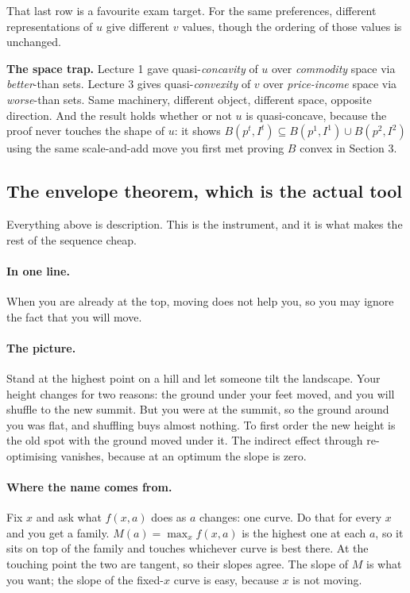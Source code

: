 \documentclass[11pt]{article}
\theoremstyle{definition}
\newenvironment{keybox}{\begin{snugshade}\noindent\ignorespaces}{\end{snugshade}}
\begin{document}
\vspace{3pt}
That last row is a favourite exam target. For the same preferences, different
representations of $u$ give different $v$ values, though the ordering of those values is
unchanged.

\begin{keybox}
\textbf{The space trap.} Lecture 1 gave quasi-\emph{concavity} of $u$ over \emph{commodity}
space via \emph{better}-than sets. Lecture 3 gives quasi-\emph{convexity} of $v$ over
\emph{price-income} space via \emph{worse}-than sets. Same machinery, different object,
different space, opposite direction. And the result holds whether or not $u$ is
quasi-concave, because the proof never touches the shape of $u$: it shows
$B(p^t,I^t)\subseteq B(p^1,I^1)\cup B(p^2,I^2)$ using the same scale-and-add move you first
met proving $B$ convex in Section 3.
\end{keybox}

\subsection{The envelope theorem, which is the actual tool}

Everything above is description. This is the instrument, and it is what makes the rest of
the sequence cheap.

\paragraph{In one line.} When you are already at the top, moving does not help you, so you
may ignore the fact that you will move.

\paragraph{The picture.} Stand at the highest point on a hill and let someone tilt the
landscape. Your height changes for two reasons: the ground under your feet moved, and you
will shuffle to the new summit. But you were at the summit, so the ground around you was
flat, and shuffling buys almost nothing. To first order the new height is the old spot with
the ground moved under it. The indirect effect through re-optimising vanishes, because at
an optimum the slope is zero.

\paragraph{Where the name comes from.} Fix $x$ and ask what $f(x,a)$ does as $a$ changes:
one curve. Do that for every $x$ and you get a family. $M(a)=\max_x f(x,a)$ is the highest
one at each $a$, so it sits on top of the family and touches whichever curve is best there.
At the touching point the two are tangent, so their slopes agree. The slope of $M$ is what
you want; the slope of the fixed-$x$ curve is easy, because $x$ is not moving.
\end{document}
